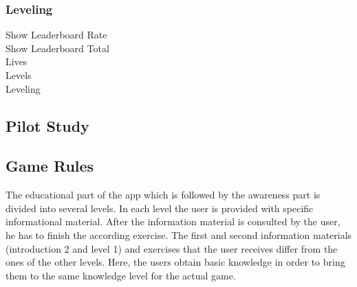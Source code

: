 \subsubsection{Leveling}

\begin{description}
	\item[Show Leaderboard Rate]
	\item[Show Leaderboard Total]
	\item[Lives]
	\item[Levels]
	\item[Leveling]
\end{description}

\subsection{Pilot Study}
\subsection{Game Rules}
The educational part of the app which is followed by the awareness part is divided into several levels.
 In each level the user is provided with specific informational material.
 After the information material is consulted by the user, he has to finish the according exercise.
The first  and second information materials (introduction 2 and level 1) and exercises that the user receives differ from the ones of the other levels. Here, the users obtain basic knowledge in order to bring them to the same knowledge level for the actual game.
 
